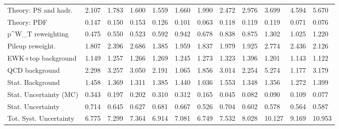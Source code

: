 \begin{tabular}{l|p{0.6cm}p{0.6cm}p{0.6cm}p{0.6cm}p{0.6cm}p{0.6cm}p{0.6cm}p{0.6cm}p{0.6cm}p{0.6cm}p{0.6cm}}
Theory: PS and hadr.                     & 2.107 & 1.783 & 1.600 & 1.559 & 1.660 & 1.990 & 2.472 & 2.976 & 3.699 & 4.594 & 5.670 \\
Theory: PDF                              & 0.147 & 0.150 & 0.153 & 0.126 & 0.101 & 0.063 & 0.118 & 0.119 & 0.119 & 0.071 & 0.076 \\
p^{W}_{T} reweighting                    & 0.475 & 0.550 & 0.523 & 0.592 & 0.942 & 0.678 & 0.838 & 0.875 & 1.302 & 1.025 & 1.220 \\
Pileup reweight.                         & 1.807 & 2.396 & 2.686 & 1.385 & 1.959 & 1.837 & 1.979 & 1.925 & 2.774 & 2.436 & 2.126 \\
EWK+top background                       & 1.149 & 1.257 & 1.266 & 1.269 & 1.245 & 1.273 & 1.323 & 1.396 & 1.201 & 1.143 & 1.122 \\
QCD background                           & 2.298 & 3.257 & 3.050 & 2.191 & 1.065 & 1.856 & 3.014 & 2.254 & 5.274 & 1.177 & 3.179 \\
Stat. Background                         & 1.458 & 1.369 & 1.311 & 1.385 & 1.440 & 1.036 & 1.553 & 1.348 & 1.356 & 1.272 & 1.399 \\
Stat. Uncertainty (MC)                   & 0.343 & 0.197 & 0.202 & 0.310 & 0.312 & 0.165 & 0.045 & 0.082 & 0.090 & 0.109 & 0.077 \\
\hline
Stat. Uncertainty                        & 0.714 & 0.645 & 0.627 & 0.681 & 0.667 & 0.526 & 0.704 & 0.602 & 0.578 & 0.564 & 0.587 \\
\hline
Tot. Syst. Uncertainty                   & 6.775 & 7.299 & 7.364 & 6.914 & 7.081 & 6.749 & 7.532 & 8.028 & 10.127 & 9.169 & 10.953 \\
\hline
\end{tabular}
